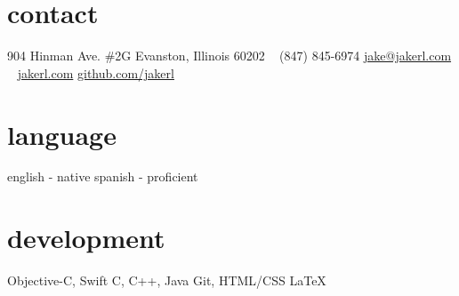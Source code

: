 \documentclass[print]{resume}
\begin{document}

\begin{aside}
\section{contact}
904 Hinman Ave. \#2G
Evanston, Illinois 60202
~
(847) 845-6974
\href{mailto:jake@jakerl.com}{jake@jakerl.com}
~
\href{http://www.jakerl.com}{jakerl.com}
\href{https://github.com/jakerl}{github.com/jakerl}
\section{language}
english - native
spanish - proficient
\section{development}
Objective-C, Swift
C, C++, Java
Git, HTML/CSS
\LaTeX

\end{aside}
\end{document}
